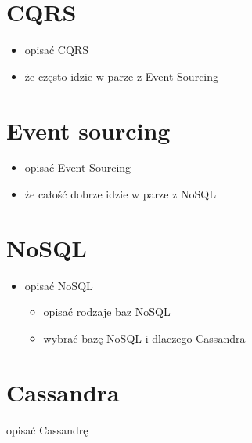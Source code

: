 \section{CQRS}

\begin{itemize}
 \item opisać CQRS
 \item że często idzie w parze z Event Sourcing
\end{itemize}



\section{Event sourcing}

\begin{itemize}
 \item opisać Event Sourcing
 \item że całość dobrze idzie w parze z NoSQL
\end{itemize}



\section{NoSQL}

\begin{itemize}
 \item opisać NoSQL
  \begin{itemize}
   \item opisać rodzaje baz NoSQL
   \item wybrać bazę NoSQL i dlaczego Cassandra
  \end{itemize}
\end{itemize}



\section{Cassandra}

opisać Cassandrę
